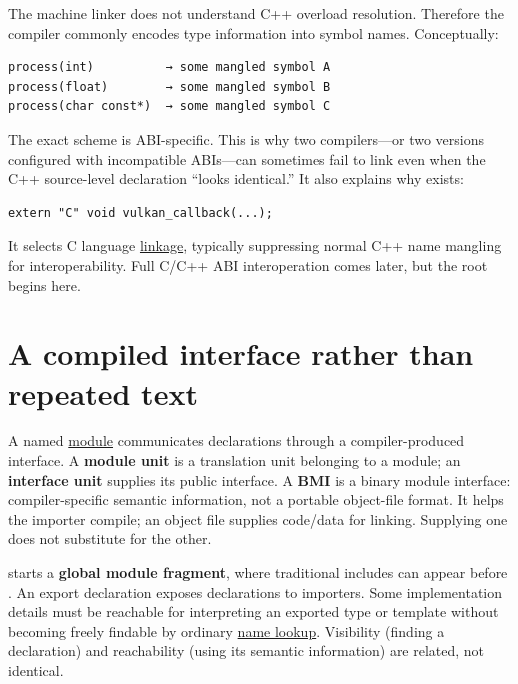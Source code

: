 The machine linker does not understand C++ overload resolution. Therefore the compiler commonly encodes type information into symbol names. Conceptually:

\begin{verbatim}
process(int)          → some mangled symbol A
process(float)        → some mangled symbol B
process(char const*)  → some mangled symbol C
\end{verbatim}

The exact scheme is ABI-specific. This is why two compilers---or two versions configured with incompatible ABIs---can sometimes fail to link even when the C++ source-level declaration ``looks identical.'' It also explains why  exists:

\begin{verbatim}
extern "C" void vulkan_callback(...);
\end{verbatim}

It selects C language \hyperref[appendix-74a0ec818c18]{linkage}, typically suppressing normal C++ name mangling for interoperability. Full C/C++ ABI interoperation comes later, but the root begins here.

\section{A compiled interface rather than repeated text}\label{01-foundations-i-ch002-a-compiled-interface-rather-than-repeated-text}

\hypertarget{01-foundations-i-ch002-a-compiled-interface-rather-than-repeated-text}{}

A named \hyperref[appendix-410a611a5b8d]{module} communicates declarations through a compiler-produced interface. A \textbf{module unit} is a translation unit belonging to a module; an \textbf{interface unit} supplies its public interface. A \textbf{BMI} is a binary module interface: compiler-specific semantic information, not a portable object-file format. It helps the importer compile; an object file supplies code/data for linking. Supplying one does not substitute for the other.

 starts a \textbf{global module fragment}, where traditional includes can appear before . An export declaration exposes declarations to importers. Some implementation details must be reachable for interpreting an exported type or template without becoming freely findable by ordinary \hyperref[appendix-b12b31759da1]{name lookup}. Visibility (finding a declaration) and reachability (using its semantic information) are related, not identical.

